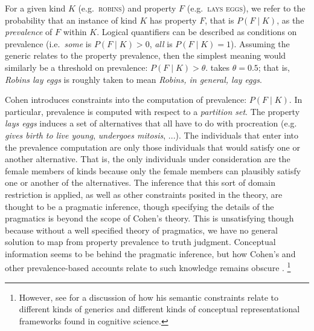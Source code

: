 \documentclass[12pt,letterpaper]{article}
\begin{document}
For a given kind $K$ (e.g.~\textsc{robins}) and property $F$ (e.g.~\textsc{lays eggs}), we refer to the probability that an instance of kind $K$ has property $F$, that is $P(F\mid K)$, as the \emph{prevalence} of $F$ within $K$.
Logical quantifiers can be described as conditions on prevalence (i.e.~\emph{some} is $P(F\mid K)>0$, \emph{all} is $P(F\mid K)=1$). 
Assuming the generic relates to the property prevalence, then the simplest meaning would similarly be a threshold on prevalence: $P(F\mid K)>\theta$.  takes $\theta = 0.5$; that is, \emph{Robins lay eggs} is roughly taken to mean \emph{Robins, in general, lay eggs}. 

Cohen introduces constraints into the computation of prevalence: $P(F\mid K)$. In particular, prevalence is computed with respect to a \emph{partition set}. 
The property \emph{lays eggs} induces a set of alternatives that all have to do with procreation (e.g. \emph{gives birth to live young}, \emph{undergoes mitosis}, ...).
The individuals that enter into the prevalence computation are only those individuals that would satisfy one or another alternative. 
That is, the only individuals under consideration are the female members of kinds because only the female members can plausibly satisfy one or another of the alternatives.
The inference that this sort of domain restriction is applied, as well as other constraints posited in the theory, are thought to be a pragmatic inference, though specifying the details of the pragmatics is beyond the scope of Cohen's theory.
This is unsatisfying though because without a well specified theory of pragmatics, we have no general solution to map from property prevalence to truth judgment.
Conceptual information seems to be behind the pragmatic inference, but how Cohen's and other prevalence-based accounts relate to such knowledge remains obscure \cite{Carlson1995essay}.
\footnote{However, see  for a discussion of how his semantic constraints relate to different kinds of generics and different kinds of conceptual representational frameworks found in cognitive science.}

\end{document}
